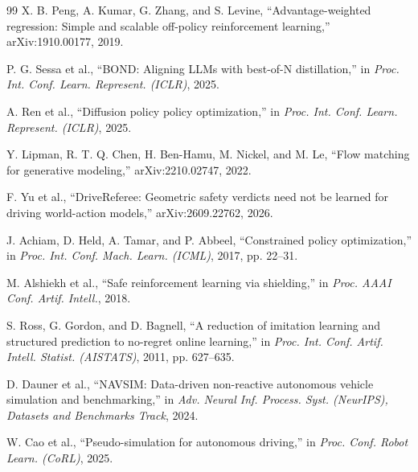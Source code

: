 \documentclass[letterpaper,10pt,conference]{ieeeconf}
\begin{document}
\begin{thebibliography}{99}
X. B. Peng, A. Kumar, G. Zhang, and S. Levine, ``Advantage-weighted regression: Simple and scalable off-policy reinforcement learning,'' arXiv:1910.00177, 2019.

P. G. Sessa et al., ``BOND: Aligning LLMs with best-of-N distillation,'' in \emph{Proc. Int. Conf. Learn. Represent. (ICLR)}, 2025.

A. Ren et al., ``Diffusion policy policy optimization,'' in \emph{Proc. Int. Conf. Learn. Represent. (ICLR)}, 2025.

Y. Lipman, R. T. Q. Chen, H. Ben-Hamu, M. Nickel, and M. Le, ``Flow matching for generative modeling,'' arXiv:2210.02747, 2022.

F. Yu et al., ``DriveReferee: Geometric safety verdicts need not be learned for driving world-action models,'' arXiv:2609.22762, 2026.

J. Achiam, D. Held, A. Tamar, and P. Abbeel, ``Constrained policy optimization,'' in \emph{Proc. Int. Conf. Mach. Learn. (ICML)}, 2017, pp. 22--31.

M. Alshiekh et al., ``Safe reinforcement learning via shielding,'' in \emph{Proc. AAAI Conf. Artif. Intell.}, 2018.

S. Ross, G. Gordon, and D. Bagnell, ``A reduction of imitation learning and structured prediction to no-regret online learning,'' in \emph{Proc. Int. Conf. Artif. Intell. Statist. (AISTATS)}, 2011, pp. 627--635.

D. Dauner et al., ``NAVSIM: Data-driven non-reactive autonomous vehicle simulation and benchmarking,'' in \emph{Adv. Neural Inf. Process. Syst. (NeurIPS), Datasets and Benchmarks Track}, 2024.

W. Cao et al., ``Pseudo-simulation for autonomous driving,'' in \emph{Proc. Conf. Robot Learn. (CoRL)}, 2025.

\end{thebibliography}
\end{document}

